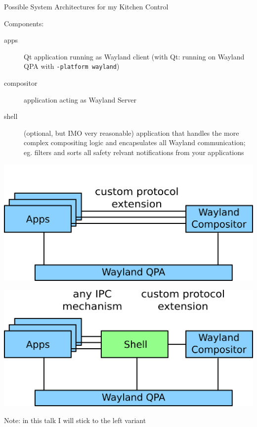 \documentclass[ucs,9pt]{beamer}
\begin{document}
\begin{frame}
    {Possible System Architectures for my Kitchen Control}

    Components:
    \begin{description}
        \item [apps] Qt application running as Wayland client (with Qt: running on Wayland QPA with {\tt -platform wayland})
        \item [compositor] application acting as Wayland Server
        \item [shell] (optional, but IMO very reasonable) application that handles the more complex compositing logic and encapsulates all Wayland communication; eg. filters and sorts all safety relvant notifications from your applications
    \end{description}
    \medskip

    \begin{multicols}{2}
        \includegraphics[width=\linewidth]{architecture.png}
        \columnbreak

        \includegraphics[width=\linewidth]{architecture-shell.png}
    \end{multicols}

    Note: in this talk I will stick to the left variant
\end{frame}
\end{document}
